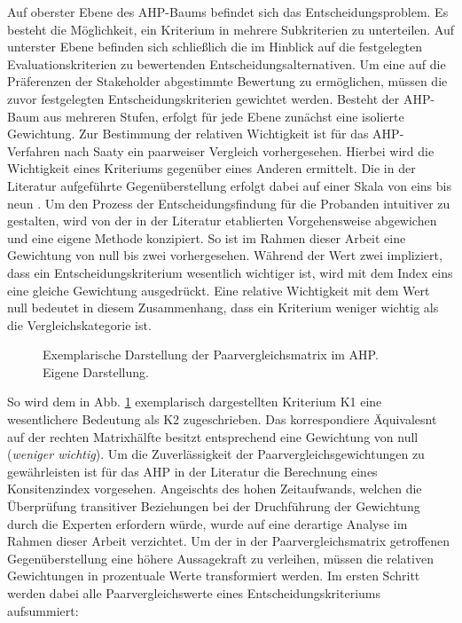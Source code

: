 Auf oberster Ebene des AHP-Baums befindet sich das Entscheidungsproblem. Es besteht die Möglichkeit, ein Kriterium in mehrere Subkriterien zu unterteilen. Auf unterster Ebene befinden sich schließlich die im Hinblick auf die festgelegten Evaluationskriterien zu bewertenden Entscheidungsalternativen. Um eine auf die Präferenzen der Stakeholder abgestimmte Bewertung zu ermöglichen, müssen die zuvor festgelegten Entscheidungskriterien gewichtet werden. Besteht der AHP-Baum aus mehreren Stufen, erfolgt für jede Ebene zunächst eine isolierte Gewichtung. Zur Bestimmung der relativen Wichtigkeit ist für das AHP-Verfahren nach Saaty ein paarweiser Vergleich vorhergesehen. Hierbei wird die Wichtigkeit eines Kriteriums gegenüber eines Anderen ermittelt. Die in der Literatur aufgeführte Gegenüberstellung erfolgt dabei auf einer Skala von eins bis neun \cite[86]{Saaty.2008}. Um den Prozess der Entscheidungsfindung für die Probanden intuitiver zu gestalten, wird von der in der Literatur etablierten Vorgehensweise abgewichen und eine eigene Methode konzipiert. So ist im Rahmen dieser Arbeit eine Gewichtung von null bis zwei vorhergesehen. Während der Wert zwei impliziert, dass ein Entscheidungskriterium wesentlich wichtiger ist, wird mit dem Index eins eine gleiche Gewichtung ausgedrückt. Eine relative Wichtigkeit mit dem Wert null bedeutet in diesem Zusammenhang, dass ein Kriterium weniger wichtig als die Vergleichskategorie ist.  
\begin{center}
	\begin{figure}[H]
		\centering
		\caption[Exemplarische Darstellung der Paarvergleichsmatrix im AHP]{Exemplarische Darstellung der Paarvergleichsmatrix im AHP.\\ Eigene Darstellung.}
		\label{fig:AHP_B}
	\end{figure}
\end{center}
\vspace*{-15mm}
So wird dem in Abb. \ref*{fig:AHP_B} exemplarisch dargestellten Kriterium K1 eine wesentlichere Bedeutung als K2 zugeschrieben. Das korrespondiere Äquivalesnt auf der rechten Matrixhälfte besitzt entsprechend eine Gewichtung von null (\textit{weniger wichtig}). Um die Zuverlässigkeit der Paarvergleichsgewichtungen zu gewährleisten ist für das AHP in der Literatur die Berechnung eines Konsitenzindex vorgesehen. Angeischts des hohen Zeitaufwands, welchen die Überprüfung transitiver Beziehungen bei der Druchführung der Gewichtung durch die Experten erfordern würde, wurde auf eine derartige Analyse im Rahmen dieser Arbeit verzichtet. Um der in der Paarvergleichsmatrix getroffenen Gegenüberstellung eine höhere Aussagekraft zu verleihen, müssen die relativen Gewichtungen in prozentuale Werte transformiert werden. Im ersten Schritt werden dabei alle Paarvergleichswerte eines Entscheidungskriteriums aufsummiert:\\
